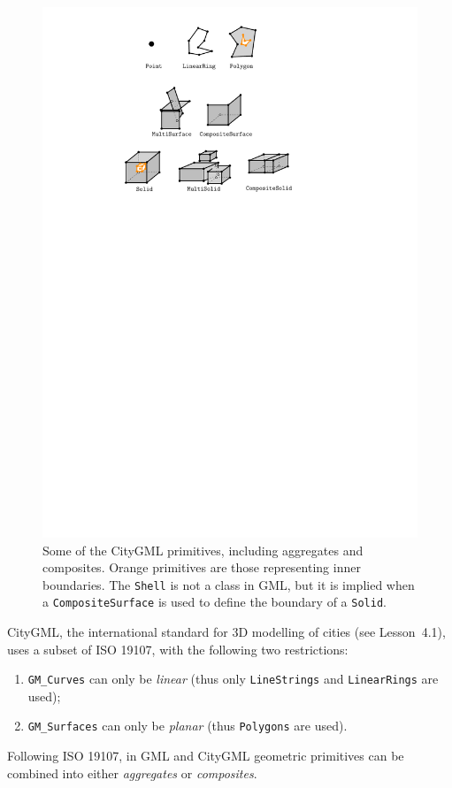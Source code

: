 \begin{figure}
  \centering
  \includegraphics[width=0.7\linewidth]{figs/geomprimitives.pdf}
  \caption{Some of the CityGML primitives, including aggregates and composites. Orange primitives are those representing inner boundaries. The \texttt{Shell} is not a class in GML, but it is implied when a \texttt{CompositeSurface} is used to define the boundary of a \texttt{Solid}.}%
\label{fig:geomprimitives}
\end{figure}

%

CityGML, the international standard for 3D modelling of cities (see Lesson~4.1), uses a subset of ISO 19107, with the following two restrictions: 
\begin{enumerate}
  \item \texttt{GM\_Curves} can only be \emph{linear} (thus only \texttt{LineStrings} and \texttt{LinearRings} are used); 
  \item \texttt{GM\_Surfaces} can only be \emph{planar} (thus \texttt{Polygons} are used).
\end{enumerate}

%

Following ISO 19107, in GML and CityGML geometric primitives can be combined into either \emph{aggregates} or \emph{composites}.

